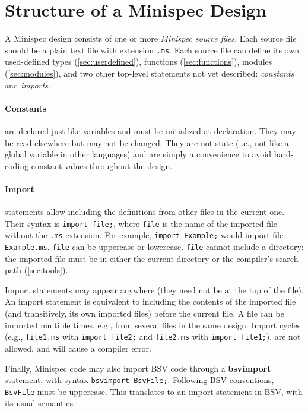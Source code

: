 \section{Structure of a Minispec Design}
\label{sec:design}

A Minispec design consists of one or more \emph{Minispec source files}.
Each source file should be a plain text file with extension \verb|.ms|.
Each source file can define its own used-defined types (\autoref{sec:userdefined}),
functions (\autoref{sec:functions}), modules (\autoref{sec:modules}),
and two other top-level statements not yet described: \emph{constants} and \emph{imports}.

\paragraph{Constants} are declared just like variables and must be initialized at declaration.
They may be read elsewhere but may not be changed. They are not state
(i.e., not like a global variable in other languages) and are simply a convenience
to avoid hard-coding constant values throughout the design.

\paragraph{Import} statements allow including the definitions from other files in the current one.
Their syntax is \verb|import file;|, where \verb|file| is the name of the imported file without the \verb|.ms| extension.
For example, \verb|import Example;| would import file \verb|Example.ms|.
\verb|file| can be uppercase or lowercase.
\verb|file| cannot include a directory: the imported file must be
in either the current directory or the compiler's search path (\autoref{sec:tools}).

Import statements may appear anywhere (they need not be at the top of the file).
An import statement is equivalent to including the contents of the imported file (and transitively, its own imported files)
before the current file.
A file can be imported multiple times, e.g., from several files in the same design.
Import cycles
(e.g., \verb|file1.ms| with \verb|import file2;| and \verb|file2.ms| with \verb|import file1;|).
are not allowed, and will cause a compiler error.

Finally, Minispec code may also import BSV code through a \textbf{bsvimport} statement, with syntax
\verb|bsvimport BsvFile;|. Following BSV conventions, \verb|BsvFile| must be uppercase.
This translates to an import statement in BSV, with its usual semantics.
